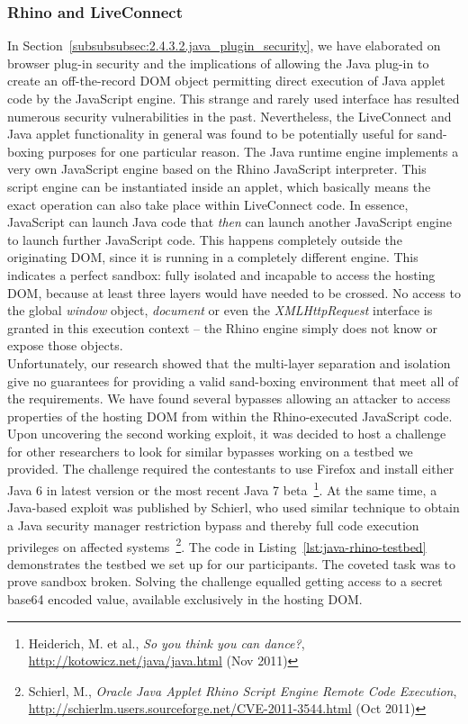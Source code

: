     \subsubsection{Rhino and LiveConnect}
    \label{subsubsec:4.10.4.rhino_and_live_connect}

    In Section~\ref{subsubsubsec:2.4.3.2.java_plugin_security}, we have elaborated on browser plug-in security and the implications of allowing the Java plug-in to create an off-the-record DOM object permitting direct execution of Java applet code by the JavaScript engine. This strange and rarely used interface has resulted numerous security vulnerabilities in the past. Nevertheless, the LiveConnect and Java applet functionality in general was found to be potentially useful for sand-boxing purposes for one particular reason. The Java runtime engine implements a very own JavaScript engine based on the Rhino JavaScript interpreter. This script engine can be instantiated inside an applet, which basically means the exact operation can also take place within LiveConnect code. In essence, JavaScript can launch Java code that \textit{then} can launch another JavaScript engine to launch further JavaScript code. This happens completely outside the originating DOM, since it is running in a completely different engine. 
This indicates a perfect sandbox: fully isolated and incapable to access the hosting DOM, because at least three layers would have needed to be crossed. No access to the global \textit{window} object, \textit{document} or even the \textit{XMLHttpRequest} interface is granted in this execution context -- the Rhino engine simply does not know or expose those objects.\\

    Unfortunately, our research showed that the multi-layer separation and isolation give no guarantees for providing a valid sand-boxing environment that meet all of the requirements. We have found several bypasses allowing an attacker to access properties of the hosting DOM from within the Rhino-executed JavaScript code. Upon uncovering the second working exploit, it was decided to host a challenge for other researchers to look for similar bypasses working on a testbed we provided. The challenge required the contestants to use Firefox and install either Java 6 in latest version or the most recent Java 7 beta~\footnote{Heiderich, M. et al., \textit{So you think you can dance?}, \url{http://kotowicz.net/java/java.html} (Nov 2011)}. At the same time, a Java-based exploit was published by Schierl, who used  similar technique to obtain a Java security manager restriction bypass and thereby full code execution privileges on affected  systems~\footnote{Schierl, M., \textit{Oracle Java Applet Rhino Script Engine 
Remote Code Execution}, \url{http://schierlm.users.sourceforge.net/CVE-2011-3544.html} (Oct 2011)}. The code in Listing~\ref{lst:java-rhino-testbed} demonstrates the testbed we set up for our participants. The coveted task was to prove  sandbox broken. Solving the challenge equalled getting access to a secret base64 encoded value, available exclusively in the hosting DOM.

